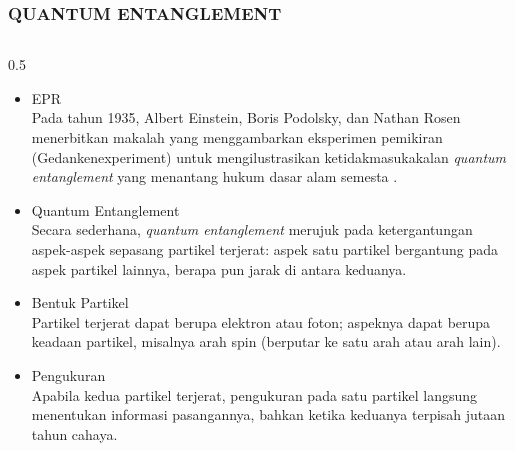 \begin{frame}
    \frametitle{QUANTUM ENTANGLEMENT \cite{muller2023}}
    \begin{columns}[T]
        \begin{column}{0.5\textwidth}
            \begin{itemize}\tiny\justifying
                \item EPR \\
                    Pada tahun 1935, Albert Einstein, Boris Podolsky, dan Nathan
                    Rosen menerbitkan makalah yang menggambarkan eksperimen
                    pemikiran (Gedankenexperiment) untuk mengilustrasikan
                    ketidakmasukakalan \textit{quantum entanglement} yang
                    menantang hukum dasar alam semesta \cite{einstein1935can}.
                \item Quantum Entanglement \\
                    Secara sederhana, \textit{quantum entanglement} merujuk pada
                    ketergantungan aspek-aspek sepasang partikel terjerat:
                    aspek satu partikel bergantung pada aspek partikel lainnya,
                    berapa pun jarak di antara keduanya.
                \item Bentuk Partikel \\
                    Partikel terjerat dapat berupa elektron atau foton;
                    aspeknya dapat berupa keadaan partikel, misalnya arah
                    spin (berputar ke satu arah atau arah lain).
                \item Pengukuran \\
                    Apabila kedua partikel terjerat, pengukuran pada satu
                    partikel langsung menentukan informasi pasangannya, bahkan
                    ketika keduanya terpisah jutaan tahun cahaya.
            \end{itemize}
        \end{column}


\end{columns}
\end{frame}
